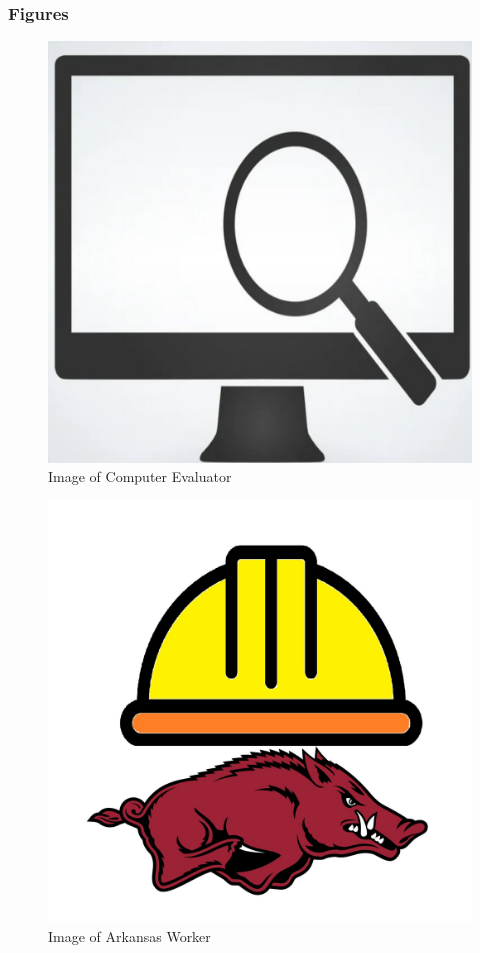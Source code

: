 \subsubsection{Figures}
\newline
\begin{figure}[H]
 \captionsetup{justification=raggedright,singlelinecheck=false}
\caption{Image of Computer Evaluator }
\includegraphics[scale=0.2]{figure2/C.jpg} 
\end{figure}

\begin{figure}[H]
 \captionsetup{justification=raggedright,singlelinecheck=false}
\caption{Image of Arkansas Worker }
\includegraphics[scale=0.2]{figure2/WA.jpg} 
\end{figure}

